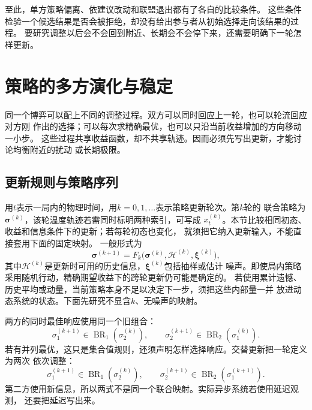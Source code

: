 至此，单方策略偏离、依建议改动和联盟退出都有了各自的比较条件。
这些条件检验一个候选结果是否会被拒绝，却没有给出参与者从初始选择走向该结果的过程。
要研究调整以后会不会回到附近、长期会不会停下来，还需要明确下一轮怎样更新。

\section{策略的多方演化与稳定}
\label{sec:game-policy-evolution}

同一个博弈可以配上不同的调整过程。双方可以同时回应上一轮，也可以轮流回应对方刚
作出的选择；可以每次求精确最优，也可以只沿当前收益增加的方向移动一小步。
这些过程共享收益函数，却不共享轨迹。因而必须先写出更新，才能讨论均衡附近的扰动
或长期极限。

\subsection{更新规则与策略序列}
\label{sec:game-update-sequences}

用\(t\)表示一局内的物理时间，用\(k=0,1,\ldots\)表示策略更新轮次。第\(k\)轮的
联合策略为\(\bm\sigma^{(k)}\)，该轮温度轨迹若需同时标明两种索引，可写成
\(x_t^{(k)}\)。本节比较相同初态、收益和信息条件下的更新；若每轮初态也变化，
就须把它纳入更新输入，不能直接套用下面的固定映射。
一般形式为
\[
  \bm\sigma^{(k+1)}
  =F_k\bigl(\bm\sigma^{(k)},\mathcal H^{(k)},\bm\xi^{(k)}\bigr),
\]
其中\(\mathcal H^{(k)}\)是更新时可用的历史信息，\(\bm\xi^{(k)}\)包括抽样或估计
噪声。即使局内策略采用随机行动，精确期望收益下的跨轮更新仍可能是确定的。
若使用累计遗憾、历史平均或动量，当前策略本身不足以决定下一步，须把这些内部量一并
放进动态系统的状态。下面先研究不显含\(k\)、无噪声的映射。

两方的同时最佳响应使用同一个旧组合：
\begin{equation}
  \sigma_1^{(k+1)}\in\operatorname{BR}_1(\sigma_2^{(k)}),
  \qquad
  \sigma_2^{(k+1)}\in\operatorname{BR}_2(\sigma_1^{(k)}).
  \label{eq:game-simultaneous-best-response}
\end{equation}
若有并列最优，这只是集合值规则，还须声明怎样选择响应。交替更新把一轮定义为两次
依次调整：
\begin{equation}
  \sigma_1^{(k+1)}\in\operatorname{BR}_1(\sigma_2^{(k)}),
  \qquad
  \sigma_2^{(k+1)}\in\operatorname{BR}_2(\sigma_1^{(k+1)}).
  \label{eq:game-alternating-best-response}
\end{equation}
第二方使用新信息，所以两式不是同一个联合映射。实际异步系统若使用延迟观测，
还要把延迟写出来。

